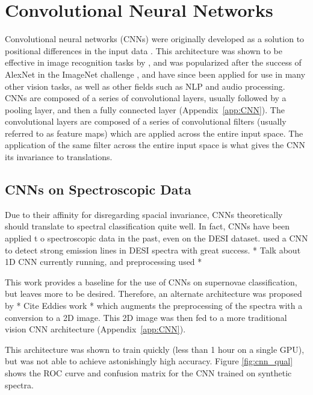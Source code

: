 \section{Convolutional Neural Networks}
\label{sec:CNN}
Convolutional neural networks (CNNs) were originally developed as a solution 
to positional differences in the input data \parencite{fukushima1979}. This architecture 
was shown to be effective in image recognition tasks by \textcite{lecun2004}, and 
was popularized after the success of AlexNet in the 
ImageNet challenge \textcite{krizhevsky2012}, and have since been applied for use in 
many other vision tasks, as well as other fields such as NLP and audio processing. 
CNNs are composed of a series of convolutional layers, usually followed by a 
pooling layer, and then a fully connected layer (Appendix~\ref{app:CNN}). The convolutional layers are 
composed of a series of convolutional filters (usually referred to as feature maps)
which are applied across the entire input space. The application of the same filter 
across the entire input space is what gives the CNN its invariance to translations.

\subsection{CNNs on Spectroscopic Data}
\label{sec:CNNspectra}
Due to their affinity for disregarding spacial invariance, CNNs theoretically should 
translate to spectral classification quite well. In fact, CNNs have been applied t
o spectroscopic data in the past, even on the DESI dataset. 
\textcite{parks2018} used a CNN to detect strong emission lines in DESI spectra with 
great success. * Talk about 1D CNN currently running, and preprocessing used *

This work provides a baseline for the use of CNNs on supernovae classification, 
but leaves more to be desired. Therefore, an alternate architecture was proposed 
by * Cite Eddies work * which augments the preprocessing of the spectra with 
a conversion to a 2D image. This 2D image was then fed to a more traditional vision 
CNN architecture (Appendix~\ref{app:CNN}). 

This architecture was shown to train quickly (less than 1 hour on a single GPU), 
but was not able to achieve astonishingly high accuracy. Figure \ref{fig:cnn_qual}
shows the ROC curve and confusion matrix for the CNN trained on synthetic spectra. 

